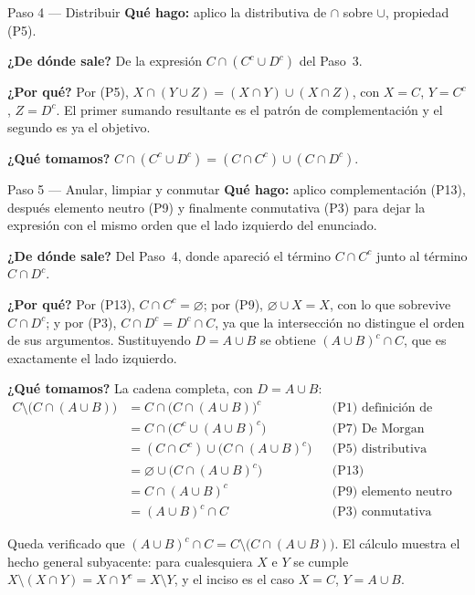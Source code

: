\documentclass[11pt]{article}
\begin{document}
\begin{paso}{Paso 4 --- Distribuir}
\textbf{Qué hago:} aplico la distributiva de $\cap$ sobre $\cup$, propiedad (P5).

\textbf{¿De dónde sale?} De la expresión $C\cap(C^{c}\cup D^{c})$ del Paso~3.

\textbf{¿Por qué?} Por (P5), $X\cap(Y\cup Z)=(X\cap Y)\cup(X\cap Z)$, con $X=C$, $Y=C^{c}$,
$Z=D^{c}$. El primer sumando resultante es el patrón de complementación y el segundo es ya el
objetivo.

\textbf{¿Qué tomamos?} $C\cap(C^{c}\cup D^{c})=(C\cap C^{c})\cup(C\cap D^{c})$.
\end{paso}

\begin{paso}{Paso 5 --- Anular, limpiar y conmutar}
\textbf{Qué hago:} aplico complementación (P13), después elemento neutro (P9) y finalmente
conmutativa (P3) para dejar la expresión con el mismo orden que el lado izquierdo del enunciado.

\textbf{¿De dónde sale?} Del Paso~4, donde apareció el término $C\cap C^{c}$ junto al término
$C\cap D^{c}$.

\textbf{¿Por qué?} Por (P13), $C\cap C^{c}=\varnothing$; por (P9), $\varnothing\cup X=X$, con lo
que sobrevive $C\cap D^{c}$; y por (P3), $C\cap D^{c}=D^{c}\cap C$, ya que la intersección no
distingue el orden de sus argumentos. Sustituyendo $D=A\cup B$ se obtiene $(A\cup B)^{c}\cap C$,
que es exactamente el lado izquierdo.

\textbf{¿Qué tomamos?} La cadena completa, con $D=A\cup B$:
\begin{align*}
C\setminus\bigl(C\cap(A\cup B)\bigr)
&=C\cap\bigl(C\cap(A\cup B)\bigr)^{c} && \text{(P1) definición de diferencia}\\
&=C\cap\bigl(C^{c}\cup(A\cup B)^{c}\bigr) && \text{(P7) De Morgan}\\
&=(C\cap C^{c})\cup\bigl(C\cap(A\cup B)^{c}\bigr) && \text{(P5) distributiva}\\
&=\varnothing\cup\bigl(C\cap(A\cup B)^{c}\bigr) && \text{(P13) complementación}\\
&=C\cap(A\cup B)^{c} && \text{(P9) elemento neutro}\\
&=(A\cup B)^{c}\cap C && \text{(P3) conmutativa}
\end{align*}
\end{paso}

\begin{resp}
Queda verificado que $(A\cup B)^{c}\cap C=C\setminus\bigl(C\cap(A\cup B)\bigr)$. El cálculo
muestra el hecho general subyacente: para cualesquiera $X$ e $Y$ se cumple
$X\setminus(X\cap Y)=X\cap Y^{c}=X\setminus Y$, y el inciso es el caso $X=C$, $Y=A\cup B$.
\end{resp}
\end{document}
